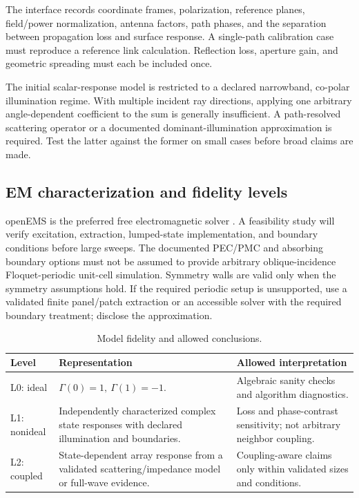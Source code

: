 \documentclass[conference]{IEEEtran}
\begin{document}
The interface records coordinate frames, polarization, reference planes, field/power normalization, antenna factors, path phases, and the separation between propagation loss and surface response. A single-path calibration case must reproduce a reference link calculation. Reflection loss, aperture gain, and geometric spreading must each be included once.

The initial scalar-response model is restricted to a declared narrowband, co-polar illumination regime. With multiple incident ray directions, applying one arbitrary angle-dependent coefficient to the sum is generally insufficient. A path-resolved scattering operator or a documented dominant-illumination approximation is required. Test the latter against the former on small cases before broad claims are made.

\subsection{EM characterization and fidelity levels}
openEMS is the preferred free electromagnetic solver \cite{openems}. A feasibility study will verify excitation, extraction, lumped-state implementation, and boundary conditions before large sweeps. The documented PEC/PMC and absorbing boundary options \cite{openemsbc} must not be assumed to provide arbitrary oblique-incidence Floquet-periodic unit-cell simulation. Symmetry walls are valid only when the symmetry assumptions hold. If the required periodic setup is unsupported, use a validated finite panel/patch extraction or an accessible solver with the required boundary treatment; disclose the approximation.

\begin{table}[t]
\caption{Model fidelity and allowed conclusions.}
\small
\begin{tabularx}{\linewidth}{@{}p{18mm}YY@{}}
\toprule
Level & Representation & Allowed interpretation\\
\midrule
L0: ideal & $\Gamma(0)=1,\ \Gamma(1)=-1$. & Algebraic sanity checks and algorithm diagnostics.\\
L1: nonideal & Independently characterized complex state responses with declared illumination and boundaries. & Loss and phase-contrast sensitivity; not arbitrary neighbor coupling.\\
L2: coupled & State-dependent array response from a validated scattering/impedance model or full-wave evidence. & Coupling-aware claims only within validated sizes and conditions.\\
\bottomrule
\end{tabularx}
\end{table}
\end{document}
